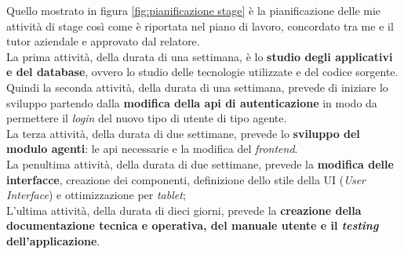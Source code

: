 Quello mostrato in figura \ref{fig:pianificazione stage} è la pianificazione delle mie attività di stage 
così come è riportata nel piano di lavoro, concordato tra me e il tutor aziendale e approvato dal relatore.\\
La prima attività, della durata di una settimana, è lo \textbf{studio degli applicativi e del database}, ovvero 
lo studio delle tecnologie utilizzate e del codice sorgente.\\
Quindi la seconda attività, della durata di una settimana, prevede di iniziare lo sviluppo partendo dalla \textbf{modifica 
della \gls{api} di autenticazione} in modo da permettere il \textit{login} del nuovo tipo di utente di tipo agente.\\
La terza attività, della durata di due settimane, prevede lo \textbf{sviluppo del modulo agenti}: le \gls{api} necessarie e la modifica del \textit{frontend}.\\
La penultima attività, della durata di due settimane, prevede la \textbf{modifica delle interfacce}, creazione dei componenti, 
definizione dello stile della UI (\textit{User Interface}) e ottimizzazione per \textit{tablet};\\
L'ultima attività, della durata di dieci giorni, prevede la \textbf{creazione della documentazione tecnica e operativa, 
del manuale utente e il \textit{testing} dell'applicazione}.